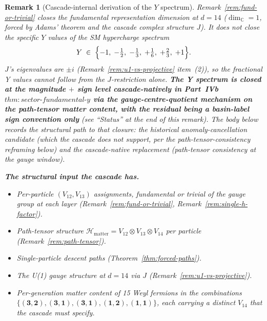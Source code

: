 \documentclass[12pt,a4paper]{article}
\newtheorem{remark}[theorem]{Remark}
\begin{document}
\begin{remark}[Cascade-internal derivation of the $Y$ spectrum]\label{rem:y-spectrum-open}
Remark~\ref{rem:fund-or-trivial} closes the fundamental representation
\emph{dimension} at $d=14$ ($\dim_{\mathbb{C}}=1$, forced by Adams'
theorem and the cascade complex structure $J$). It does not close the
specific $Y$ \emph{values} of the SM hypercharge spectrum
\[
Y\;\in\;\Bigl\{-1,\;-\tfrac{1}{2},\;-\tfrac{1}{3},\;
+\tfrac{1}{6},\;+\tfrac{2}{3},\;+1\Bigr\}.
\]
$J$'s eigenvalues are $\pm i$ (Remark~\ref{rem:u1-vs-projective}
item~(2)), so the fractional Y values cannot follow from the
$J$-restriction alone. \textbf{The Y spectrum is closed at the
magnitude $+$ sign level cascade-natively in
Part~IVb~\cite{part4b}~$\mathit{thm{:}sector\text{-}fundamental\text{-}y}$
via the gauge-centre-quotient mechanism on the path-tensor matter
content, with the residual being a basin-label sign convention only}
(see ``Status'' at the end of this remark). The body below records the
structural path to that closure: the historical anomaly-cancellation
candidate (which the cascade does not support, per the
path-tensor-consistency reframing below) and the cascade-native
replacement (path-tensor consistency at the gauge window).

\medskip\noindent\textbf{The structural input the cascade has.}
\begin{itemize}
\item Per-particle $(V_{12},V_{13})$ assignments, fundamental or
  trivial of the gauge group at each layer
  (Remark~\ref{rem:fund-or-trivial}, Remark~\ref{rem:single-h-factor}).
\item Path-tensor structure
  $\mathcal{H}_{\text{matter}}=V_{12}\otimes V_{13}\otimes V_{14}$
  per particle (Remark~\ref{rem:path-tensor}).
\item Single-particle descent paths
  (Theorem~\ref{thm:forced-paths}).
\item The U(1) gauge structure at $d=14$ via $J$
  (Remark~\ref{rem:u1-vs-projective}).
\item Per-generation matter content of 15 Weyl fermions in the
  combinations $\{(\mathbf{3},\mathbf{2}),(\mathbf{3},\mathbf{1}),
  (\mathbf{3},\mathbf{1}),(\mathbf{1},\mathbf{2}),(\mathbf{1},
  \mathbf{1})\}$, each carrying a distinct $V_{14}$ that the cascade
  must specify.
\end{itemize}


\end{remark}
\end{document}
